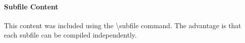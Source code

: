 \documentclass[file1.tex]{subfiles}
\begin{document}
\paragraph{Subfile Content}
This content was included using the \textbackslash subfile command. The advantage is that each subfile can be compiled independently.
\end{document}
